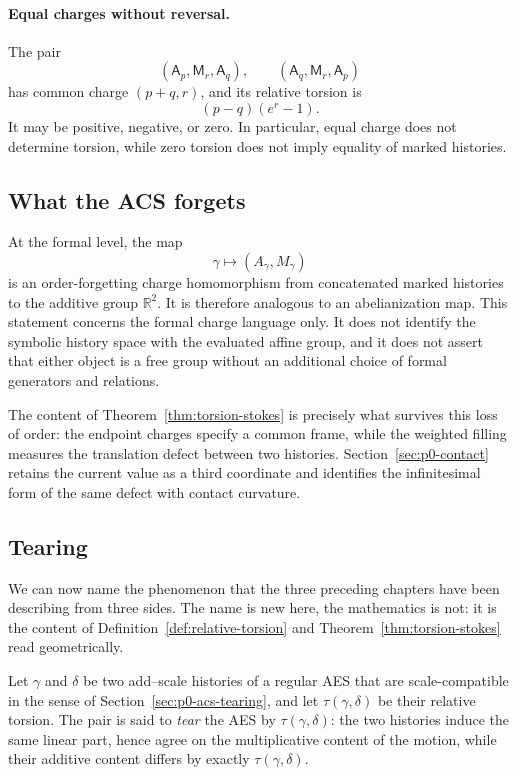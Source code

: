 \paragraph{Equal charges without reversal.}
The pair
\[
    (\mathsf A_p,\mathsf M_r,\mathsf A_q),
    \qquad
    (\mathsf A_q,\mathsf M_r,\mathsf A_p)
\]
has common charge \((p+q,r)\), and its relative torsion is
\[
    (p-q)(e^r-1).
\]
It may be positive, negative, or zero.  In particular, equal charge does not
determine torsion, while zero torsion does not imply equality of marked
histories.

\subsection{What the ACS forgets}
\label{subsec:p0-acs-forgets}

At the formal level, the map
\[
    \gamma\longmapsto(A_\gamma,M_\gamma)
\]
is an order-forgetting charge homomorphism from concatenated marked histories
to the additive group \(\mathbb R^2\).  It is therefore analogous to an
abelianization map.  This statement concerns the formal charge language only.
It does not identify the symbolic history space with the evaluated affine
group, and it does not assert that either object is a free group without an
additional choice of formal generators and relations.

The content of Theorem~\ref{thm:torsion-stokes} is precisely what survives this
loss of order: the endpoint charges specify a common frame, while the weighted
filling measures the translation defect between two histories.
Section~\ref{sec:p0-contact} retains the current value as a third coordinate and
identifies the infinitesimal form of the same defect with contact curvature.

\subsection{Tearing}
\label{subsec:p0-tearing}

We can now name the phenomenon that the three preceding chapters have been
describing from three sides.  The name is new here, the mathematics is not: it
is the content of Definition~\ref{def:relative-torsion} and
Theorem~\ref{thm:torsion-stokes} read geometrically.

\begin{definition}
\label{def:p0-tearing}
Let $\gamma$ and $\delta$ be two add--scale histories of a regular AES that are
scale-compatible in the sense of Section~\ref{sec:p0-acs-tearing}, and let
$\tau(\gamma,\delta)$ be their relative torsion.  The pair is said to \emph{tear}
the AES by $\tau(\gamma,\delta)$: the two histories induce the same linear part,
hence agree on the multiplicative content of the motion, while their additive
content differs by exactly $\tau(\gamma,\delta)$.
\end{definition}

